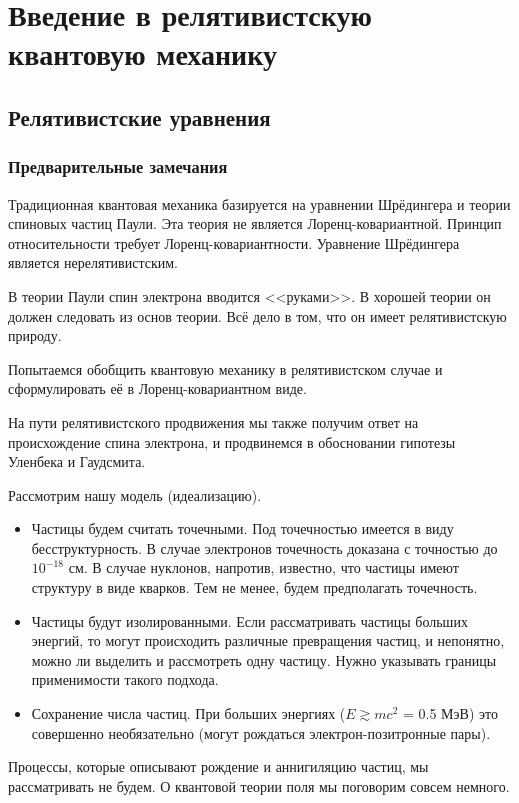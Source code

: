 \chapter{Введение в релятивистскую квантовую механику}

\section{Релятивистские уравнения}

\subsection{Предварительные замечания}

Традиционная квантовая механика базируется на уравнении Шрёдингера и теории спиновых частиц Паули. Эта теория не является Лоренц-ковариантной. Принцип относительности требует Лоренц-ковариантности. Уравнение Шрёдингера является нерелятивистским.

В теории Паули спин электрона вводится <<руками>>. В хорошей теории он должен следовать из основ теории. Всё дело в том, что он имеет релятивистскую природу.

Попытаемся обобщить квантовую механику в релятивистском случае и сформулировать её в Лоренц-ковариантном виде.

На пути релятивистского продвижения мы также получим ответ на происхождение спина электрона, и продвинемся в обосновании гипотезы Уленбека и Гаудсмита.

Рассмотрим нашу модель (идеализацию). 
\begin{itemize}
  \item Частицы будем считать точечными. Под точечностью имеется в виду бесструктурность. В случае электронов точечность доказана с точностью до $10^{-18}$ см. В случае нуклонов, напротив, известно, что частицы имеют структуру в виде кварков. Тем не менее, будем предполагать точечность.
  \item Частицы будут изолированными. Если рассматривать частицы больших энергий, то могут происходить различные превращения частиц, и непонятно, можно ли выделить и рассмотреть одну частицу. Нужно указывать границы применимости такого подхода.
  \item Сохранение числа частиц. При больших энергиях ($E \gtrsim mc^2$ = 0.5 МэВ) это совершенно необязательно (могут рождаться электрон-позитронные пары).
\end{itemize}

Процессы, которые описывают рождение и аннигиляцию частиц, мы рассматривать не будем. О квантовой теории поля мы поговорим совсем немного.

